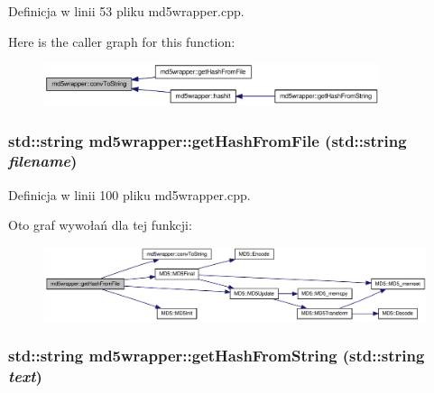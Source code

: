 Definicja w linii 53 pliku md5wrapper.cpp.

Here is the caller graph for this function:\nopagebreak
\begin{figure}[H]
\begin{center}
\leavevmode
\includegraphics[width=279pt]{d0/d0b/a00004_74f856c53740d3beb133074baffd21aa_icgraph}
\end{center}
\end{figure}
\hypertarget{a00004_e6cd2a7928b997c5d6388ae81a0d841a}{
\subsubsection[{getHashFromFile}]{\setlength{\rightskip}{0pt plus 5cm}std::string md5wrapper::getHashFromFile (std::string {\em filename})}}
\label{d0/d0b/a00004_e6cd2a7928b997c5d6388ae81a0d841a}




Definicja w linii 100 pliku md5wrapper.cpp.

Oto graf wywołań dla tej funkcji:\nopagebreak
\begin{figure}[H]
\begin{center}
\leavevmode
\includegraphics[width=387pt]{d0/d0b/a00004_e6cd2a7928b997c5d6388ae81a0d841a_cgraph}
\end{center}
\end{figure}
\hypertarget{a00004_225ba5a78228b867c3f17fdba959d8e6}{
\subsubsection[{getHashFromString}]{\setlength{\rightskip}{0pt plus 5cm}std::string md5wrapper::getHashFromString (std::string {\em text})}}
\label{d0/d0b/a00004_225ba5a78228b867c3f17fdba959d8e6}




